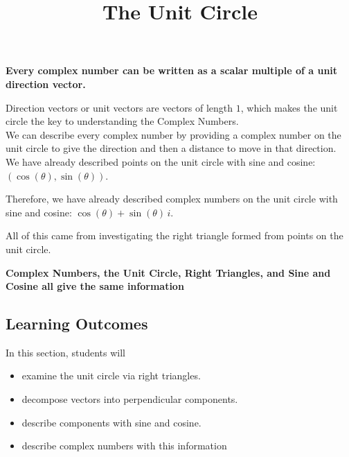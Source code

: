 \documentclass{ximera}
\title{The Unit Circle}
\begin{document}
\begin{abstract}
\end{abstract}
\maketitle




\begin{center}
\textbf{\textcolor{red!70!black}{Every complex number can be written as a scalar multiple of a unit direction vector.}}
\end{center}






Direction vectors or unit vectors are vectors of length $1$, which makes the unit circle the key to understanding the Complex Numbers. \\ 



We can describe every complex number by providing a complex number on the unit circle to give the direction and then a distance to move in that direction.  \\ 

We have already described points on the unit circle with sine and cosine: $(\cos(\theta), \sin(\theta))$. 

Therefore, we have already described complex numbers on the unit circle with sine and cosine: $\cos(\theta) + \sin(\theta) \, i$.  


All of this came from investigating the right triangle formed from points on the unit circle. \\



\begin{center}
\textbf{\textcolor{purple!85!blue}{Complex Numbers, the Unit Circle, Right Triangles, and Sine and Cosine all give the same information}}
\end{center}









\subsection*{Learning Outcomes}


\begin{sectionOutcomes}
In this section, students will 

\begin{itemize}
\item examine the unit circle via right triangles.
\item decompose vectors into perpendicular components.
\item describe components with sine and cosine.
\item describe complex numbers with this information
\end{itemize}
\end{sectionOutcomes}
\end{document}
